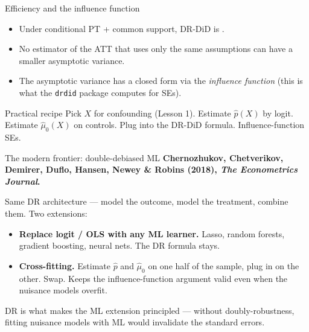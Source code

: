 \documentclass[aspectratio=169,11pt]{beamer}
\begin{document}
\begin{frame}{Efficiency and the influence function}
\vspace{0.4em}
\begin{itemize}\small
  \item Under conditional PT + common support, DR-DiD is .
  \item No estimator of the ATT that uses only the same assumptions can have a smaller asymptotic variance.
  \item The asymptotic variance has a closed form via the \textit{influence function} (this is what the \texttt{drdid} package computes for SEs).
\end{itemize}
\vspace{0.5em}
\begin{block}{Practical recipe}
\small
Pick $X$ for confounding (Lesson 1). \;\; Estimate $\widehat{p}(X)$ by logit. \;\; Estimate $\widehat{\mu}_0(X)$ on controls. \;\; Plug into the DR-DiD formula. \;\; Influence-function SEs.
\end{block}
\end{frame}

\begin{frame}{The modern frontier: double-debiased ML}
\footnotesize
\textbf{Chernozhukov, Chetverikov, Demirer, Duflo, Hansen, Newey \& Robins (2018), \textit{The Econometrics Journal}.}

\vspace{0.5em}
Same DR architecture --- model the outcome, model the treatment, combine them. \;Two extensions:

\vspace{0.4em}
\begin{itemize}\setlength\itemsep{3pt}
  \item \textbf{Replace logit / OLS with any ML learner.} \;Lasso, random forests, gradient boosting, neural nets. \;The DR formula stays.
  \item \textbf{Cross-fitting.} \;Estimate $\widehat{p}$ and $\widehat{\mu}_0$ on one half of the sample, plug in on the other. \;Swap. \;Keeps the influence-function argument valid even when the nuisance models overfit.
\end{itemize}

\vspace{0.5em}
 \;DR is what makes the ML extension principled --- without doubly-robustness, fitting nuisance models with ML would invalidate the standard errors.

\vspace{0.4em}
\end{frame}
\end{document}
